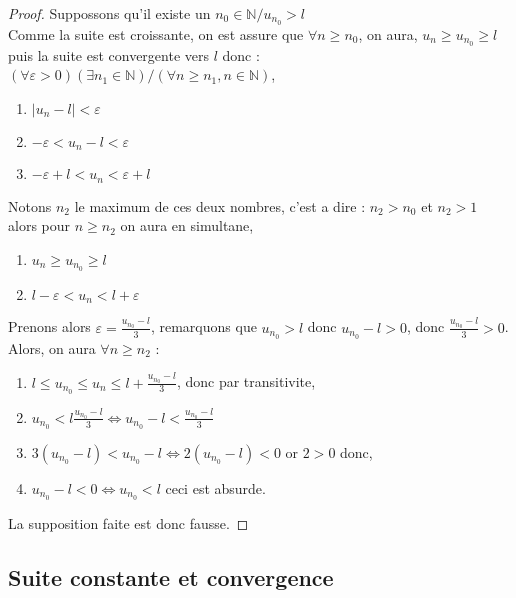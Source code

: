\documentclass[a4paper,10pt]{book}
\begin{document}
  \begin{proof}
    Suppossons qu'il existe un $n_0 \in \mathbb{N} / u_{n_0} > l$\\
    Comme la suite est croissante, on est assure que $\forall n \geq n_0$, on aura, $u_n \geq u_{n_0} \geq l$ puis la suite est convergente vers $l$ donc :\\
    $(\forall \varepsilon > 0)(\exists n_1 \in \mathbb{N}) / (\forall n \geq n_1, n \in \mathbb{N})$,
    \begin{enumerate}
      \item $|u_n -l| < \varepsilon $
      \item $- \varepsilon < u_n - l < \varepsilon $
      \item $-\varepsilon + l < u_n < \varepsilon + l$\\
    \end{enumerate}
    Notons $n_2$ le maximum de ces deux nombres, c'est a dire : $n_2 > n_0$ et $n_2 > 1$\\
    alors pour $n \geq n_2$ on aura en simultane,
    \begin{enumerate}
      \item $u_n \geq u_{n_0} \geq l$
      \item $l - \varepsilon < u_n < l + \varepsilon$\\
    \end{enumerate}

    Prenons alors $\varepsilon = \frac{u_{n_0} - l}{3}$, remarquons que $u_{n_0} > l$ donc $u_{n_0} - l > 0$, donc $\frac{u_{n_0} - l}{3} > 0$.\\
    Alors, on aura $\forall n \geq n_2$ :
    \begin{enumerate}
      \item $l \leq u_{n_0} \leq u_n \leq l + \frac{u_{n_0} - l}{3}$, donc par transitivite,
      \item $u_{n_0} < l \frac{u_{n_0} - l}{3} \Leftrightarrow u_{n_0} - l < \frac{u_{n_0} - l}{3}$
      \item $3(u_{n_0} - l) < u_{n_0} - l \Leftrightarrow 2(u_{n_0} - l) < 0$ or $2 > 0$ donc,
      \item $u_{n_0} - l < 0 \Leftrightarrow u_{n_0} < l$ ceci est absurde.
    \end{enumerate}

    La supposition faite est donc fausse.
  \end{proof}

  \subsection{Suite constante et convergence}
  \label{subs:Suite constante et convergence}
\end{document}
